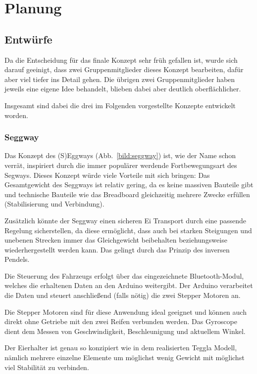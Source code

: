 \chapter{Planung}
\section{Entwürfe}
Da die Entscheidung für das finale Konzept sehr früh gefallen ist, wurde sich darauf geeinigt, dass zwei Gruppenmitglieder dieses Konzept bearbeiten, dafür aber viel tiefer ins Detail gehen. 
Die übrigen zwei Gruppenmitglieder haben jeweils eine eigene Idee behandelt, blieben dabei aber deutlich oberflächlicher. 

Insgesamt sind dabei die drei im Folgenden vorgestellte Konzepte entwickelt worden.

\subsection{Seggway}
Das Konzept des (S)Eggways (Abb.~\ref{bild:seggway}) ist, wie der Name schon verrät, inspiriert durch die immer populärer werdende Fortbewegungsart des Segways. 
Dieses Konzept würde viele Vorteile mit sich bringen: Das Gesamtgewicht des Seggways ist relativ gering, da es keine massiven Bauteile gibt und technische Bauteile wie das Breadboard gleichzeitig mehrere Zwecke erfüllen (Stabilisierung und Verbindung). 

Zusätzlich könnte der Seggway einen sicheren Ei Transport durch eine passende Regelung sicherstellen, da diese ermöglicht, dass auch bei starken Steigungen und unebenen Strecken immer das Gleichgewicht beibehalten beziehungsweise wiederhergestellt werden kann. 
Das gelingt durch das Prinzip des inversen Pendels. 

Die Steuerung des Fahrzeugs erfolgt über das eingezeichnete Bluetooth-Modul, welches die erhaltenen Daten an den Arduino weitergibt. 
Der Arduino verarbeitet die Daten und steuert anschließend (falls nötig) die zwei Stepper Motoren an. 

Die Stepper Motoren sind für diese Anwendung ideal geeignet und können auch direkt ohne Getriebe mit den zwei Reifen verbunden werden. 
Das Gyroscope dient dem Messen von Geschwindigkeit, Beschleunigung und aktuellem Winkel. 

Der Eierhalter ist genau so konzipiert wie in dem realisierten Teggla Modell, nämlich mehrere einzelne Elemente um möglichst wenig Gewicht mit möglichst viel Stabilität zu verbinden.

